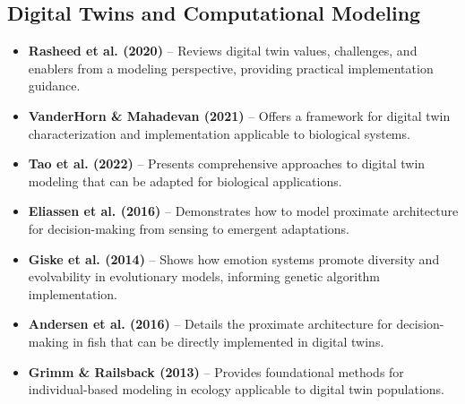 \documentclass[11pt,a4paper]{article}
\begin{document}
\subsection*{Digital Twins and Computational Modeling}
\begin{itemize}
    \item \textbf{Rasheed et al. (2020)} \cite{rasheed2020digital} -- Reviews digital twin values, challenges, and enablers from a modeling perspective, providing practical implementation guidance.
    
    \item \textbf{VanderHorn \& Mahadevan (2021)} \cite{vanderhorn2021digital} -- Offers a framework for digital twin characterization and implementation applicable to biological systems.
    
    \item \textbf{Tao et al. (2022)} \cite{tao2022digital} -- Presents comprehensive approaches to digital twin modeling that can be adapted for biological applications.
    
    \item \textbf{Eliassen et al. (2016)} \cite{eliassen2016sensing} -- Demonstrates how to model proximate architecture for decision-making from sensing to emergent adaptations.
    
    \item \textbf{Giske et al. (2014)} \cite{giske2014emotion} -- Shows how emotion systems promote diversity and evolvability in evolutionary models, informing genetic algorithm implementation.
    
    \item \textbf{Andersen et al. (2016)} \cite{andersen2016proximate} -- Details the proximate architecture for decision-making in fish that can be directly implemented in digital twins.
    
    \item \textbf{Grimm \& Railsback (2013)} \cite{grimm2013individual} -- Provides foundational methods for individual-based modeling in ecology applicable to digital twin populations.
\end{itemize}
\end{document}
